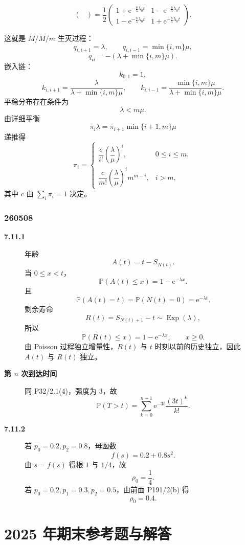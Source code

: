 \documentclass[12pt,a4paper,openany]{ctexrep}
\theoremstyle{definition}
\newcommand{\Pp}{\mathbb{P}}
\newcommand{\Exp}{\operatorname{Exp}}
\newcommand{\e}{\mathrm{e}}
\begin{document}
\begin{description}
\[\begin{pmatrix}
	\end{pmatrix}
	=
	\frac12
	\begin{pmatrix}
	1+\e^{-\frac85\lambda_0t}&1-\e^{-\frac85\lambda_0t}\\
	1-\e^{-\frac85\lambda_0t}&1+\e^{-\frac85\lambda_0t}
	\end{pmatrix}.
	\]
	\item[\textbf{P250/3}]
	这就是 $M/M/m$ 生灭过程：
	\[
	q_{i,i+1}=\lambda,\qquad
	q_{i,i-1}=\min\{i,m\}\mu,
	\]
	\[
	q_{ii}=-(\lambda+\min\{i,m\}\mu).
	\]
	嵌入链：
	\[
	k_{0,1}=1,
	\]
	\[
	k_{i,i+1}=\frac{\lambda}{\lambda+\min\{i,m\}\mu},\qquad
	k_{i,i-1}=\frac{\min\{i,m\}\mu}{\lambda+\min\{i,m\}\mu}.
	\]
	平稳分布存在条件为
	\[
	\lambda<m\mu.
	\]
	由详细平衡
	\[
	\pi_i\lambda=\pi_{i+1}\min\{i+1,m\}\mu
	\]
	递推得
	\[
	\pi_i=
	\begin{cases}
	\dfrac{c}{i!}\left(\dfrac{\lambda}{\mu}\right)^i,&0\le i\le m,\\[2ex]
	\dfrac{c}{m!}\left(\dfrac{\lambda}{\mu}\right)^i m^{m-i},&i>m,
	\end{cases}
	\]
	其中 $c$ 由 $\sum_i\pi_i=1$ 决定。
\end{description}

\subsection*{260508}

\begin{description}
	\item[\textbf{7.11.1}]
	年龄
	\[
	A(t)=t-S_{N(t)}.
	\]
	当 $0\le x<t$，
	\[
	\Pp(A(t)\le x)=1-\e^{-\lambda x}.
	\]
	且
	\[
	\Pp(A(t)=t)=\Pp(N(t)=0)=\e^{-\lambda t}.
	\]
	剩余寿命
	\[
	R(t)=S_{N(t)+1}-t\sim\Exp(\lambda),
	\]
	所以
	\[
	\Pp(R(t)\le x)=1-\e^{-\lambda x},\qquad x\ge0.
	\]
	由 Poisson 过程独立增量性，$R(t)$ 与 $t$ 时刻以前的历史独立，因此 $A(t)$ 与 $R(t)$ 独立。
	\item[\textbf{第 $n$ 次到达时间}]
	同 P32/2.1(4)，强度为 $3$，故
	\[
	\Pp(T>t)=\sum_{k=0}^{n-1}\e^{-3t}\frac{(3t)^k}{k!}.
	\]
	\item[\textbf{7.11.2}]
	若 $p_0=0.2,p_2=0.8$，母函数
	\[
	f(s)=0.2+0.8s^2.
	\]
	由 $s=f(s)$ 得根 $1$ 与 $1/4$，故
	\[
	\rho_0=\frac14.
	\]
	若 $p_0=0.2,p_1=0.3,p_2=0.5$，由前面 P191/2(b) 得
	\[
	\rho_0=0.4.
	\]
\end{description}

\chapter{2025 年期末参考题与解答}
\end{document}
